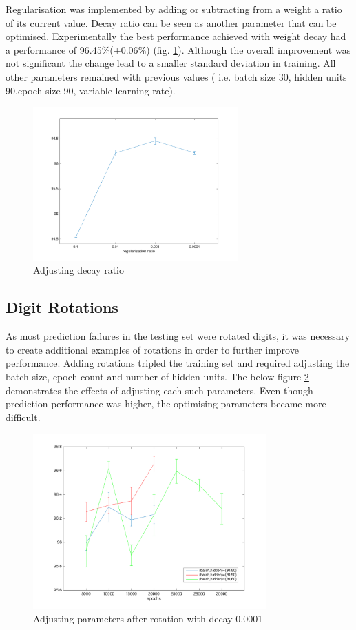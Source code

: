 \documentclass[11]{article}
\begin{document}
Regularisation was implemented by adding or subtracting from a weight a ratio of its current value. Decay ratio can be seen as another parameter that can be optimised. Experimentally the best performance achieved with weight decay had a performance of 96.45\%($\pm 0.06\%$) (fig. \ref{fig:regularisation}).  Although the overall  improvement was not significant the change lead to a smaller standard deviation in training. All other parameters remained with previous values ( i.e. batch size 30, hidden units 90,epoch size 90, variable learning rate).

\begin{figure}[h]
\centering
\includegraphics[width=0.7\textwidth]{regularisation.png}
\caption{Adjusting decay ratio}
\label{fig:regularisation}
\end{figure}

\subsection{Digit Rotations}
As most prediction failures in the testing set were rotated digits, it was necessary to create additional examples of rotations in order to further improve performance. Adding rotations tripled the training set and required adjusting the batch size, epoch count and number of hidden units. The below figure \ref{fig:rotations} demonstrates the effects of adjusting each such parameters. Even though prediction performance was higher, the optimising parameters became more difficult. 

\begin{figure}[h]
\centering
\includegraphics[width=0.8\textwidth]{rotations.png}
\caption{Adjusting parameters after rotation with decay 0.0001}
\label{fig:rotations}
\end{figure}
\end{document}
